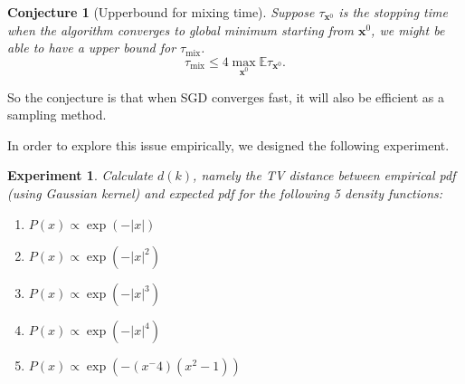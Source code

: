\documentclass[preprint,12pt,3p]{elsarticle}
\newcommand{\bx}{\mathbf{x}}
\newcommand{\E}{\mathbb{E}}
\newtheorem{conjecture}{Conjecture}
\newtheorem{experiment}{Experiment}
\begin{document}
\begin{conjecture}[Upperbound for mixing time] Suppose $\tau_{\bx^0}$ is the stopping time when the algorithm converges to global minimum starting from $\bx^0$, we might be able to have a upper bound for $\tau_{\mathrm{mix}}$.
\[
\tau_{\mathrm{mix}} \leq 4 \max_{\bx^0}\E \tau_{\bx^0}.
\]
\end{conjecture}

So the conjecture is that when SGD converges fast, it will also be efficient as a sampling method.

In order to explore this issue empirically, we designed the following experiment.
\begin{experiment}
Calculate $d(k)$, namely the TV distance between empirical pdf (using Gaussian kernel) and expected pdf for the following 5 density functions:
\begin{enumerate}
    \item $P(x) \propto \exp(- |x|)$
    \item $P(x) \propto \exp(- |x|^2)$
    \item $P(x) \propto \exp(- |x|^3)$
    \item $P(x) \propto \exp(- |x|^4)$
    \item $P(x) \propto \exp(- (x^ - 4)(x^2 - 1))$
\end{enumerate}
\end{experiment}
\end{document}
